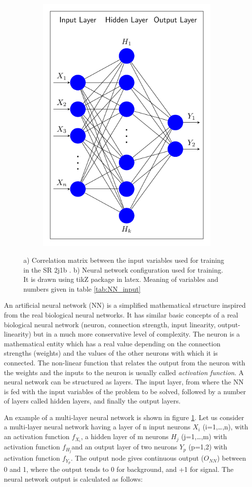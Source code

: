 \begin{figure}[h!]
\begin{subfigure}[b]{0.5\linewidth}
    \includegraphics[width=0.6\linewidth]{ubonn-thesis/Chapters/Chapters_06/Figure/Neural Network/neural_network.pdf} 
    \caption{}
    \label{NN_config}
  \end{subfigure}
  \caption{ a) Correlation matrix between the input variables used for training in the SR 2j1b . b) Neural network configuration used for training. It is drawn using tikZ package in latex. Meaning of variables and numbers given in table \ref{tab:NN_input}}
  \label{fig:NN_configuration}
  \end{figure}


An artificial neural network (NN) is a simplified mathematical structure inspired from the real biological neural networks. It has similar basic concepts of a real biological neural network (neuron, connection strength, input linearity, output-linearity) but in a much more conservative level of complexity. The neuron is a mathematical entity which has a real value depending on the connection strengths (weights) and the values of the other neurons with which it is connected. The non-linear function that relates the output from the neuron with the weights and the inputs to the neuron is usually called \textit{activation function}. A neural network can be structured as layers. The input layer, from where the NN is fed with the input variables of the problem to be solved, followed by a number of layers called hidden layers, and finally the output layers.


An example of a multi-layer neural network is shown in figure \ref{NN_config}. Let us consider a multi-layer neural network having a layer of n input neurons $X_{i}$ (i=1,\dots,n), with an activation function $f_{X_{i}}$, a hidden layer of m neurons $H_{j}$ (j=1,\dots,m) with activation function $f_{H_{j}}$and an output layer of two neurons $Y_{p}$ (p=1,2) with activation function $f_{Y_{p}}$. The output node gives continuous output ($O_{NN}$) between 0 and 1, where the output tends to 0 for background, and +1 for signal. The neural network output is calculated as follows:

